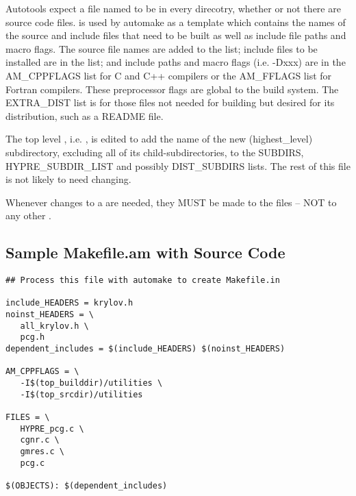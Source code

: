 Autotools expect a file named  to be in every direcotry, whether
or not there are source code files.   is used by automake as a
template which contains the names of the source and include files that need to 
be built as well as include file paths and macro flags.  The source file names 
are added to the  list; include files to be installed are in the 
 list; and include paths and macro flags (i.e. -Dxxx) are 
in the AM_CPPFLAGS list for C and C++ compilers or the AM_FFLAGS list for Fortran
compilers.  These preprocessor flags are global to the build system.  The 
EXTRA_DIST list is for those files not needed for building \hypre{} but desired 
for its distribution, such as a README file. 

The top level , i.e. , is 
edited to add the name of the new (highest_level) subdirectory, excluding all of
its child-subdirectories, to the SUBDIRS, HYPRE_SUBDIR_LIST and possibly 
DIST_SUBDIRS lists.  The rest of this file is not likely to need changing.

Whenever changes to a  are needed, they MUST be made to the 
files -- NOT to any other .

\subsection{Sample Makefile.am with Source Code}
\label{Sample Makefile.am with Source Code}

\begin{verbatim}
## Process this file with automake to create Makefile.in

include_HEADERS = krylov.h
noinst_HEADERS = \
   all_krylov.h \
   pcg.h
dependent_includes = $(include_HEADERS) $(noinst_HEADERS)

AM_CPPFLAGS = \
   -I$(top_builddir)/utilities \
   -I$(top_srcdir)/utilities 

FILES = \
   HYPRE_pcg.c \
   cgnr.c \
   gmres.c \
   pcg.c

$(OBJECTS): $(dependent_includes)

\end{verbatim}

